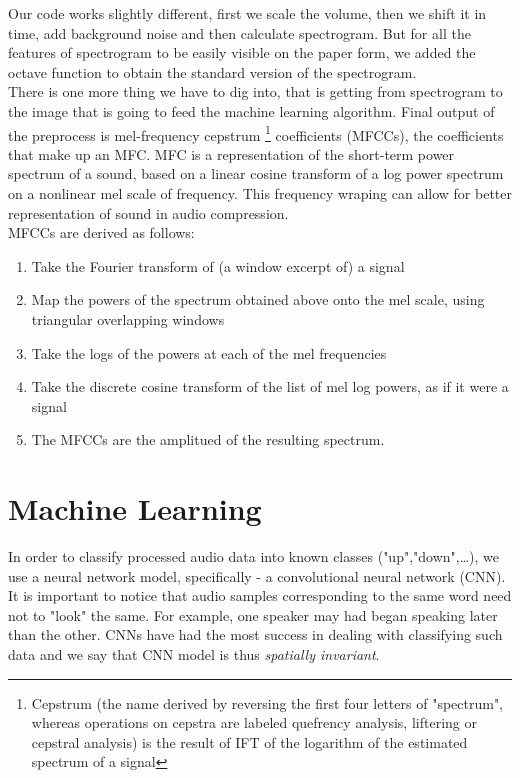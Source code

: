 \documentclass[twoside]{article}
\begin{document}
\begin{multicols}{2}
Our code works slightly different, first we scale the volume, then we shift it in time, add background noise and then calculate spectrogram. But for all the features of spectrogram to be easily visible on the paper form, we added the octave function to obtain the standard version of the spectrogram.\\
There is one more thing we have to dig into, that is getting from spectrogram to the image that is going to feed the machine learning algorithm. Final output of the preprocess is mel-frequency cepstrum \footnote{Cepstrum (the name derived by reversing the first four letters of "spectrum", whereas operations on cepstra are labeled quefrency analysis, liftering or cepstral analysis) is the result of IFT of the logarithm of the estimated spectrum of a signal} coefficients (MFCCs), the coefficients that make up an MFC. MFC is a representation of the short-term power spectrum of a sound, based on a linear cosine transform of a log power spectrum on a nonlinear mel scale of frequency. This frequency wraping can allow for better representation of sound in audio compression. \\
MFCCs are derived as follows:
\begin{enumerate}
	\item Take the Fourier transform of (a window excerpt of) a signal
	\item Map the powers of the spectrum obtained above onto the mel scale, using triangular overlapping windows
	\item Take the logs of the powers at each of the mel frequencies
	\item Take the discrete cosine transform of the list of mel log powers, as if it were a signal
	\item The MFCCs are the amplitued of the resulting spectrum.
\end{enumerate}
\section{Machine Learning}
In order to classify processed audio data into known classes ("up","down",\ldots), we use a neural network model, specifically - a convolutional neural network (CNN). It is important to notice that audio samples corresponding to the same word need not to "look" the same. For example, one speaker may had began speaking later than the other. CNNs have had the most success in dealing with classifying such data and we say that CNN model is thus \emph{spatially invariant}.


\end{multicols}
\end{document}
